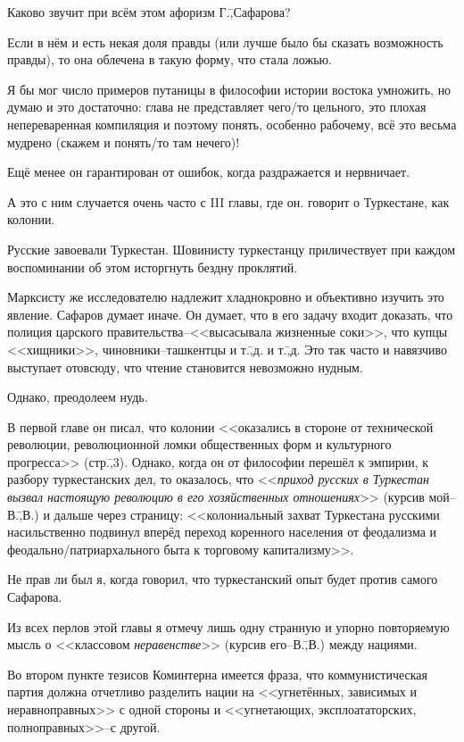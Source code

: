 Каково звучит при всём этом афоризм Г.\=,Сафарова?

Если в нём и есть некая доля правды (или лучше было бы сказать возможность правды), то она облечена в такую форму, что стала ложью.

Я бы мог число примеров путаницы в философии истории востока умножить, но думаю и это достаточно: глава не представляет чего\-/то цельного, это плохая непереваренная компиляция и поэтому понять, особенно рабочему, всё это весьма мудрено (скажем и понять\-/то там нечего)!

Ещё менее он гарантирован от ошибок, когда раздражается и нервничает.

А это с ним случается очень часто с III главы, где он. говорит о Туркестане, как колонии.

Русские завоевали Туркестан. Шовинисту туркестанцу приличествует при каждом воспоминании об этом исторгнуть бездну проклятий.

Марксисту же исследователю надлежит хладнокровно и объективно изучить это явление. Сафаров думает иначе. Он думает, что в его задачу входит доказать, что полиция царского правительства\---<<высасывала жизненные соки>>, что купцы <<хищники>>, чиновники\---ташкентцы и т.\=,д. и т.\=,д. Это так часто и навязчиво выступает отовсюду, что чтение становится невозможно нудным.

Однако, преодолеем нудь.

В первой главе он писал, что колонии <<оказались в стороне от технической революции, революционной ломки общественных форм и культурного прогресса>> (стр.\=,3). Однако, когда он от философии перешёл к эмпирии, к разбору туркестанских дел, то оказалось, что <<\emph{приход русских в Туркестан вызвал настоящую революцию в его хозяйственных отношениях}>> (курсив мой\---В.\=,В.) и дальше через страницу: <<колониальный захват Туркестана русскими насильственно подвинул вперёд переход коренного населения от феодализма и феодально\-/патриархального быта к торговому капитализму>>.

Не прав ли был я, когда говорил, что туркестанский опыт будет против самого Сафарова.

Из всех перлов этой главы я отмечу лишь одну странную и упорно повторяемую мысль о <<классовом \emph{неравенстве}>> (курсив его\---В.\=,В.) между нациями.

Во втором пункте тезисов Коминтерна имеется фраза, что коммунистическая партия должна отчетливо разделить нации на <<угнетённых, зависимых и неравноправных>> с одной стороны и <<угнетающих, эксплоататорских, полноправных>>\---с другой.

